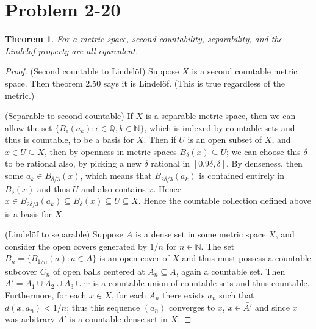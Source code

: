 \documentclass{article}
\newtheorem{theorem}[subsection]{Theorem}
\theoremstyle{definition}
\newcommand{\N}{\mathbb{N}}
\newcommand{\Q}{\mathbb{Q}}
\begin{document}
\section{Problem 2-20}
\begin{theorem}
For a metric space, second countability, separability, and the Lindel\"of property
are all equivalent.
\end{theorem}
\begin{proof}
(Second countable to Lindel\"of)
Suppose $X$ is a second countable metric space. Then theorem 2.50 says it is
Lindel\"of. (This is true regardless of the
metric.)

(Separable to second countable)
If $X$ is a separable metric space, then we can allow the set 
$\{ B_\epsilon(a_k) : \epsilon \in \Q, k \in \N\}$, which is indexed by 
countable sets and thus is countable, to be a basis for $X$. Then if 
$U$ is an open subset of $X$, and $x \in U \subseteq X$, then by openness 
in metric spaces $B_\delta ( x ) \subseteq U$; we can choose this $\delta$
to be rational also, by picking a new $\delta$ rational in 
$[0.9\delta, \delta]$. By denseness, then some 
$a_k \in B_{\delta/3} ( x )$, which means that $B_{2\delta/3}(a_k)$ 
is contained entirely in $B_{\delta}(x)$ and thus $U$ and also contains $x$. 
Hence $x \in B_{2\delta/3}(a_k) \subseteq B_\delta(x) \subseteq U \subseteq X$.
Hence the countable collection defined above is a basis for $X$.

(Lindel\"of to separable)
Suppose $A$ is a dense set in some metric space $X$, and consider the open
covers generated by $1/n$ for $n\in\N$.
The set $B_n=\{ B_{1/n}(a) : a \in A\}$ is an open cover of $X$ and thus must
possess a countable subcover $C_n$ of open balls centered at $A_n \subseteq A$,
again a countable set. Then $A'=A_1 \cup A_2 \cup A_3 \cup \cdots$ is a countable 
union of countable sets and thus countable. Furthermore, for each $x \in X$,
for each $A_n$ there exists $a_n$ such that $d(x,a_n) < 1/n$; thus this sequence
$(a_n)$ converges to $x$, $x \in \bar{A'}$ and since $x$ was arbitrary
$A'$ is a countable dense set in $X$.

%

\end{proof}
\end{document}
